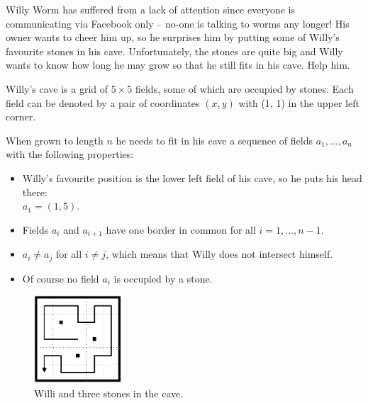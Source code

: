 
\taskheader

\newcommand{\TranslationPageOf}[2]{Page #1 of #2}
\newcommand{\TranslationDate}{April 8 -- April 12, 2013}
\newcommand{\TranslationDay}{Day 0}
\newcommand{\TranslationTL}{Time limit:}
\newcommand{\TranslationML}{Memory limit:}
\newcommand{\TranslationTLUnit}{sec per test case}
\newcommand{\TranslationMLUnit}{MB per test case}
\newcommand{\TranslationSampleSingular}{Example}
\newcommand{\TranslationSamplePlural}{Examples}
\newcommand{\TranslationSampleInput}{Input}
\newcommand{\TranslationSampleOutput}{Output}
\newcommand{\TranslationLimits}{Limits}

\newcommand{\TranslationTaskName}{Cheer the Worm Up}

\newcommand{\countrycode}{ENG}



Willy Worm has suffered from a lack of attention since everyone is communicating via Facebook only -- no-one is talking to worms any longer! His owner wants to cheer him up, so he surprises him by putting some of Willy's favourite stones in his cave. Unfortunately, the stones are quite big and Willy wants to know how long he may grow so that he still fits in his cave. Help him.

Willy's cave is a grid of $5\times 5$ fields, some of which are occupied by stones. Each field can be denoted by a pair of coordinates $(x, y)$ with (1, 1) in the upper left corner.

When grown to length $n$ he needs to fit in his cave a sequence of fields $a_1,\dots,a_n$ with the following properties:

\begin{itemize}
\item Willy's favourite position is the lower left field of his cave, so he puts his head there: \\ $a_1 = (1, 5)$.
\item Fields $a_i$ and $a_{i + 1}$ have one border in common for all $i=1,\dots,n-1$.
\item $a_i \neq a_j$ for all $i\neq j$, which means that Willy does not intersect himself.
\item Of course no field $a_i$ is occupied by a stone.
\end{itemize}

\begin{figure}[h!]
\begin{center}
\includegraphics[width=1.29in]{fig1}
\end{center}
\caption{Willi and three stones in the cave.}\label{fig1}
\end{figure}

